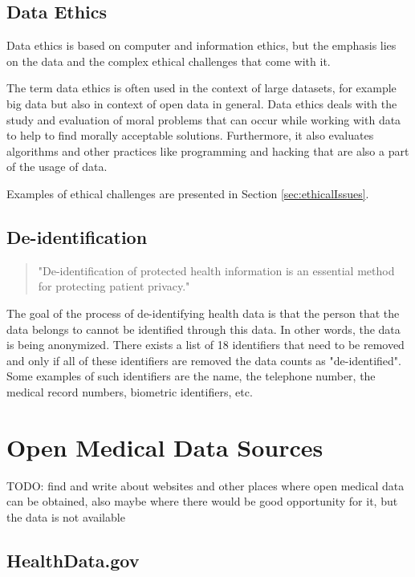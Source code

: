 \documentclass[a4paper, 11pt]{article}
\begin{document}
\subsection{Data Ethics} 
Data ethics is based on computer and information ethics, but the emphasis lies on the data and the complex ethical challenges that come with it. \cite{Floridi2016dataEthics}


The term data ethics is often used in the context of large datasets, for example big data but also in context of open data in general. Data ethics deals with the study and evaluation of moral problems that can occur while working with data to help to find morally acceptable solutions. Furthermore, it also evaluates algorithms and other practices like programming and hacking that are also a part of the usage of data. \cite{Floridi2016dataEthics}

Examples of ethical challenges are presented in Section \ref{sec:ethicalIssues}. 

\subsection{De-identification}
\begin{quote}
    "De-identification of protected health information is an essential method for protecting patient privacy." \cite[p.\ 1044]{kayaalp2017modes}
\end{quote}
The goal of the process of de-identifying health data is that the person that the data belongs to cannot be identified through this data. In other words, the data is being anonymized. There exists a list of 18 identifiers that need to be removed and only if all of these identifiers are removed the data counts as "de-identified". Some examples of such identifiers are the name, the telephone number, the medical record numbers, biometric identifiers, etc.  \cite{kayaalp2017modes}\cite{Hoffman2015} 

\section{Open Medical Data Sources}\label{sec:dataSources}
TODO: find and write about websites and other places where open medical data can be obtained, also maybe where there would be good opportunity for it, but the data is not available

\subsection{HealthData.gov}
\end{document}
